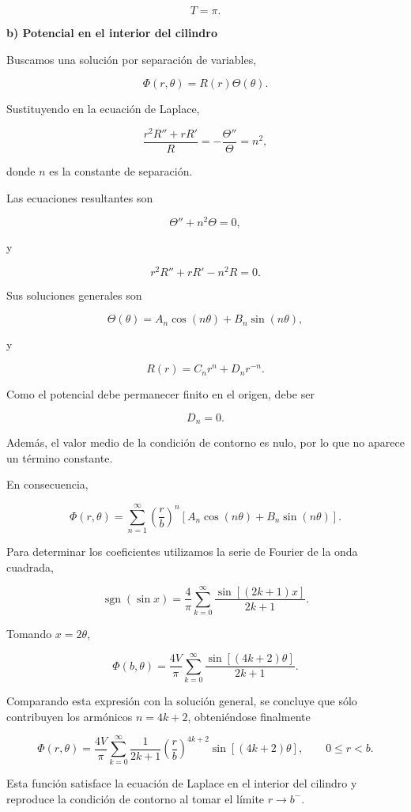 \documentclass[11pt,spanish]{article}
\begin{document}
\[
\boxed{T=\pi.}
\]

{\bf b) Potencial en el interior del cilindro}

Buscamos una solución por separación de variables,

\[
\Phi(r,\theta)=R(r)\Theta(\theta).
\]

Sustituyendo en la ecuación de Laplace,

\[
\frac{r^2R''+rR'}{R}
=
-\frac{\Theta''}{\Theta}
=n^2,
\]

donde $n$ es la constante de separación.

Las ecuaciones resultantes son

\[
\Theta''+n^2\Theta=0,
\]

y

\[
r^2R''+rR'-n^2R=0.
\]

Sus soluciones generales son

\[
\Theta(\theta)
=
A_n\cos(n\theta)
+
B_n\sin(n\theta),
\]

y

\[
R(r)
=
C_nr^n
+
D_nr^{-n}.
\]

Como el potencial debe permanecer finito en el origen, debe ser

\[
D_n=0.
\]

Además, el valor medio de la condición de contorno es nulo, por lo que no
aparece un término constante.

En consecuencia,

\[
\Phi(r,\theta)
=
\sum_{n=1}^{\infty}
\left(\frac{r}{b}\right)^n
\left[
A_n\cos(n\theta)
+
B_n\sin(n\theta)
\right].
\]

Para determinar los coeficientes utilizamos la serie de Fourier de la onda
cuadrada,

\[
\operatorname{sgn}(\sin x)
=
\frac{4}{\pi}
\sum_{k=0}^{\infty}
\frac{\sin[(2k+1)x]}{2k+1}.
\]

Tomando $x=2\theta$,

\[
\Phi(b,\theta)
=
\frac{4V}{\pi}
\sum_{k=0}^{\infty}
\frac{\sin[(4k+2)\theta]}{2k+1}.
\]

Comparando esta expresión con la solución general, se concluye que sólo
contribuyen los armónicos $n=4k+2$, obteniéndose finalmente

\[
\boxed{
\Phi(r,\theta)
=
\frac{4V}{\pi}
\sum_{k=0}^{\infty}
\frac{1}{2k+1}
\left(\frac{r}{b}\right)^{4k+2}
\sin[(4k+2)\theta],
\qquad 0\le r<b.
}
\]

Esta función satisface la ecuación de Laplace en el interior del cilindro y
reproduce la condición de contorno al tomar el límite $r\rightarrow b^{-}$.





 
\end{document}
